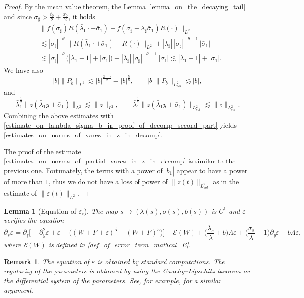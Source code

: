 \documentclass[16pt,english, oneside,reqno]{smfart}
\newcommand{\vare}{{\varepsilon}}
\newtheorem{remark}{Remark}[section]
\newtheorem{lemma}[theorem]{Lemma}
\begin{document}
\begin{proof}
By the mean value theorem, the Lemma \eqref{lemma_on_the_decaying_tail} and since $\sigma_{\sharp} > \frac{t_0}{2} + \frac{x_0}{2}$, it holds
\begin{equation}
    \begin{split}
        & \| f(\sigma_{\sharp}) R(\bar{\lambda}_1\cdot + \bar{\sigma}_1) - f(\sigma_{\sharp} + \lambda_{\sharp}\bar{\sigma}_1)R(\cdot) \|_{L^2}\\
        & \lesssim |\sigma_{\sharp}|^{-\theta}\, \| R(\bar{\lambda}_1\cdot + \bar{\sigma}_1) - R(\cdot) \|_{L^2} + |\lambda_{\sharp}|\,|\sigma_{\sharp}|^{-\theta-1}\, |\bar{\sigma}_1|\\
        & \lesssim |\sigma_{\sharp}|^{-\theta} \, \big( |\bar{\lambda}_1-1| + |\bar{\sigma}_1| \big) + |\lambda_{\sharp}|\,|\sigma_{\sharp}|^{-\theta-1}\, |\bar{\sigma}_1| \lesssim |\bar{\lambda}_1 - 1| + |\bar{\sigma}_1|.
    \end{split}
\end{equation}
We have also
\begin{equation}
    |b|\| P_{b}\|_{L^2} \lesssim |b|^{\frac{2-\gamma}{2}} = |b|^{\frac 58}, \qquad |b| \|P_{b}\|_{L^2_{sol}} \lesssim |b|,
\end{equation}
and 
\begin{equation}
    \bar{\lambda}_1^{\frac 12}\|z(\bar{\lambda}_1 y +\bar{\sigma}_1) \|_{L^2} \lesssim \|z\|_{L^2}, \qquad \bar{\lambda}_1^{\frac 12}\|z(\bar{\lambda}_1 y +\bar{\sigma}_1) \|_{L^2_{sol}} \lesssim \|z\|_{L^2_{sol}}.
\end{equation}
Combining the above estimates with \eqref{estimate_on_lambda_sigma_b_in_proof_of_decomp_second_part} yields \eqref{estimates_on_norms_of_vares_in_z_in_decomp}.

The proof of the estimate \eqref{estimates_on_norms_of_partial_vares_in_z_in_decomp} is similar to the previous one. Fortunately, the terms with a power of $|\bar{b}_1|$ appear to have a power of more than $1$, thus we do not have a loss of power of $\|z(t)\|_{L^2_{sol}}$ as in the estimate of $\|\vare(t)\|_{L^2}$.
\end{proof}

\begin{lemma}[Equation of $\vare_s$]
The map $s\mapsto (\lambda(s),\sigma(s), b(s))$ is  $C^1$ and $\vare$ verifies the equation
    \begin{equation}\label{equation_of_eps_s}
        \partial_s \vare = \partial_y \Big[ -\partial^2_y\vare + \vare - \Big( (W+F+\vare)^5 - (W+F)^5 \Big) \Big] - \mathcal{E}(W) + \Big(\frac{\lambda_s}{\lambda}+b \Big)\Lambda\vare+\Big(\frac{\sigma_s}{\lambda}-1 \Big)\partial_y\vare - b\Lambda\vare,
    \end{equation}
    where $\mathcal{E}(W)$ is defined in \eqref{def_of_error_term_mathcal_E}.
\end{lemma}
\begin{remark}
    The equation of $\vare$ is obtained by standard computations. The regularity 
    of the parameters is obtained by using the Cauchy–Lipschitz theorem on the differential system of the parameters. 
    See, for example, \cite[Lemma 2.7]{Combet-Martel-18}
    for a similar argument.
\end{remark}
\end{document}
